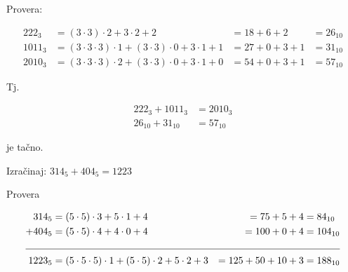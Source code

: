 \begin{zad}
\begin{figure}[H]

        \end{figure}



        Provera:

        \begin{align*}

        222_3 &= (3 \cdot 3) \cdot 2 + 3 \cdot 2 + 2 &= 18 + 6 + 2 &= 26_10 \\

        1011_3 &= (3 \cdot 3 \cdot 3) \cdot 1 + (3 \cdot 3) \cdot 0 + 3 \cdot 1 + 1 &= 27 + 0 + 3 + 1 &= 31_10 \\

        2010_3 &= (3 \cdot 3 \cdot 3) \cdot 2 + (3 \cdot 3) \cdot 0 + 3 \cdot 1 + 0 &= 54 + 0 + 3 + 1 &= 57_10

        \end{align*}

        Tj.

        \begin{align*}

            222_3 + 1011_3 &= 2010_3 \\

            26_10 + 31_10 &= 57_10

        \end{align*}

        je ta\v cno.

    \end{zad}

    \begin{zad}

        Izra\v cinaj: $314_5 + 404_5 = 1223$

        \begin{figure}[H]

            \centering


        \end{figure}

    \end{zad}



    Provera 

    \begin{align*}

    314_5 &= (5 \cdot 5) \cdot 3 + 5 \cdot 1 + 4 &= 75 + 5 + 4 &= 84_{10} \\

    + 404_5 &= (5 \cdot 5) \cdot 4 + 4 \cdot 0 + 4 &= 100 + 0 + 4 &= 104_{10} \\

    \cline{1-4}

    1223_5 &= (5 \cdot 5 \cdot 5) \cdot 1 + (5 \cdot 5) \cdot 2 + 5 \cdot 2 + 3 &= 125 + 50 + 10 + 3 &= 188_{10} 

    \end{align*}

